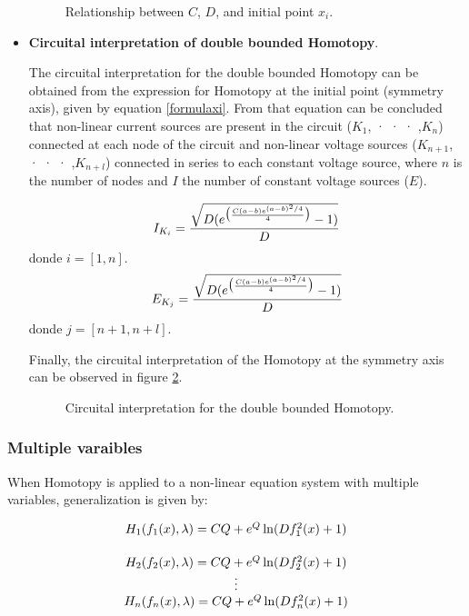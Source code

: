 \documentclass[conference,letterpaper,onecolumn]{IEEEtran}
\begin{document}
\begin{itemize}
\begin{figure}[hbtp]
\centerline{
\epsfxsize=85mm
}
\caption{Relationship between $C$, $D$, and initial point $x_i$.}
\label{cydx1}
\end{figure}

\item {\bf Circuital interpretation of double bounded Homotopy}.

The circuital interpretation for the double bounded Homotopy can be obtained from the expression for Homotopy at the initial point (symmetry axis), given by equation \ref{formulaxi}. From that equation can be concluded that non-linear current sources are present in the circuit ($K_1$, · · · ,$K_n$) connected at each node of the circuit and non-linear voltage sources ($K_{n+1}$, · · · ,$K_{n+l}$) connected in series to each constant voltage source, where $n$ is the number of nodes and $I$ the number of constant voltage sources ($E$).

\begin{equation}
I_{K_i}= {{\sqrt{ D(e^{\big ( {{C(a-b)e^{(a-b)^2/4} }  \over { 4   }} \big ) }-1 )}} \over {D}}
\label{Ikn}
\end{equation}
donde $i=[1,n]$. 
\begin{equation}
E_{K_j}= {{\sqrt{ D(e^{\big ( {{C(a-b)e^{(a-b)^2/4} }  \over { 4   }} \big ) }-1 )}} \over {D}}
\label{Ikn2}
\end{equation}
donde $j=[n+1,n+l]$.

Finally, the circuital interpretation of the Homotopy at the symmetry axis can be observed in figure \ref{circ1}.


\begin{figure}[tbp]
\centerline{
\epsfxsize=130mm
}
\caption{Circuital interpretation for the double bounded Homotopy.}
\label{circ1}
\end{figure}

\end{itemize}

\subsubsection{Multiple varaibles}

When Homotopy is applied to a non-linear equation system with multiple variables, generalization is given by:

\begin{displaymath}
\begin{array}{c}
H_1(f_1(x),\lambda)=CQ+e^{Q}\ln(Df_1^2(x)+1) \vspace{5mm} \\
H_2(f_2(x),\lambda)=CQ+e^{Q}\ln(Df_2^2(x)+1)\\
\vdots \\
H_n(f_n(x),\lambda)=CQ+e^{Q}\ln(Df_n^2(x)+1)\\
\end{array}
\end{displaymath}
\end{document}
